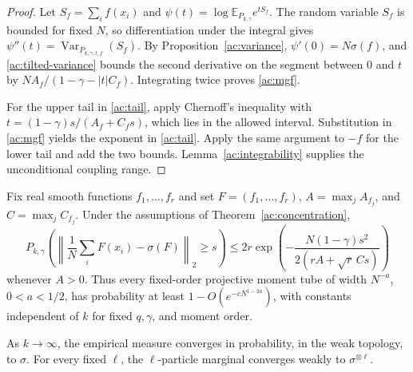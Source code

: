 \begin{proof}
Let $S_f=\sum_i f(x_i)$ and
$\psi(t)=\log\mathbb E_{P_{k,\gamma}}e^{tS_f}$.
The random variable $S_f$ is bounded for fixed $N$, so differentiation
under the integral gives
$\psi''(t)=\operatorname{Var}_{P_{k,\gamma,t,f}}(S_f)$.
By Proposition~\ref{ac:variance}, $\psi'(0)=N\sigma(f)$, and
\eqref{ac:tilted-variance} bounds the second derivative on the segment
between $0$ and $t$ by $NA_f/(1-\gamma-|t|C_f)$.
Integrating twice proves \eqref{ac:mgf}.

For the upper tail in \eqref{ac:tail}, apply Chernoff's inequality
with
$t=(1-\gamma)s/(A_f+C_fs)$, which lies in the allowed interval.
Substitution in \eqref{ac:mgf} yields the exponent in
\eqref{ac:tail}.  Apply the same argument to $-f$ for the lower tail
and add the two bounds.  Lemma~\ref{ac:integrability} supplies the
unconditional coupling range.
\end{proof}

\begin{corollary}
\label{ac:tubes}
Fix real smooth functions $f_1,\ldots,f_r$ and set
$F=(f_1,\ldots,f_r)$,
$A=\max_j A_{f_j}$, and $C=\max_j C_{f_j}$.
Under the assumptions of Theorem~\ref{ac:concentration},
\begin{equation}
 P_{k,\gamma}\!\left(
 \left\|\frac1N\sum_iF(x_i)-\sigma(F)\right\|_2\ge s\right)
 \le 2r\exp\!\left(
 -\frac{N(1-\gamma)s^2}{2(rA+\sqrt r\,Cs)}\right)
 \label{ac:vector-tail}
\end{equation}
whenever $A>0$.  Thus every fixed-order projective moment tube of
width $N^{-a}$, $0<a<1/2$, has probability at least
$1-O(e^{-cN^{1-2a}})$, with constants independent of $k$ for fixed
$q,\gamma$, and moment order.

As $k\to\infty$, the empirical measure converges in probability,
in the weak topology, to $\sigma$.  For every fixed $\ell$, the
$\ell$-particle marginal converges weakly to $\sigma^{\otimes\ell}$.
\end{corollary}


